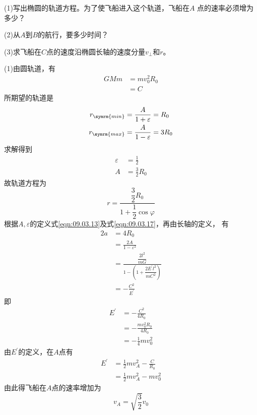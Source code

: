 (1)写出椭圆的轨道方程。为了使飞船进入这个轨道，飞船在$ A $
点的速率必须增为多少？

(2)从$ A $到$ B $的航行，要多少时间？


(3)求飞船在$ C $点的速度沿椭圆长轴的速度分量$ v _ \bot $和$ \dot{ r } $。

\solution (1)由圆轨道，有
\begin{equation*}
  \begin{split}
    G M m &= m v _ 0 ^ { 2 } R _ { 0 } \\
    &= C
  \end{split}
\end{equation*}
所期望的轨道是
\begin{align*}
  r _ { \symrm{ min } } & = \frac { A } { 1 + \varepsilon } = R _ { 0 }   \\
  r _ { \symrm{ max } } & = \frac { A } { 1 - \varepsilon } = 3 R _ { 0 }
\end{align*}
求解得到
\begin{align*}
  \varepsilon & = \frac { 1 } { 2 }           \\
  A           & = \frac { 3 } { 2 } R _ { 0 }
\end{align*}
故轨道方程为
\begin{equation*}
  r = \frac { \dfrac { 3 } { 2 } R _ { 0 } } { 1 + \dfrac { 1 } { 2 } \cos \varphi }
\end{equation*}
根据$ A , \varepsilon $的定义\lhbrak 式\eqref{eqn:09.03.13}及式\eqref{eqn:09.03.17}\rhbrak ，再由长轴的定义，
有
\begin{equation*}
  \begin{split}
    2 a &= 4 R _ { 0 } \\
    &= \frac { 2 A } { 1 - \varepsilon ^ { 2 } } \\
    &= \frac { \dfrac { 2 l ^ { 2 } } { m G } } { 1 - \left( 1 + \dfrac { 2 E ^ { \prime } l ^ { 2 } } { m C ^ { 2 } } \right) }\\
    &= - \frac { C ^ { 2 } } { E ^ { \prime } }
  \end{split}
\end{equation*}
即
\begin{equation*}
  \begin{split}
    E ^ { \prime } &= - \frac { C ^ { 2 } } { 4 R _ { 0 } } \\
    &= - \frac { m v _ 0 ^ { 2 } R _ { 0 } } { 4 R _ { 0 } } \\
    &= - \frac { 1 } { 4 } m v _ { 0 } ^ 2
  \end{split}
\end{equation*}
由$ E ^ { \prime } $的定义，在$ A $点有
\begin{equation*}
  \begin{split}
    E ^ { \prime } &= \frac { 1 } { 2 } m v _ A ^ { 2 } - \frac { C } { R _ { 0 } } \\
    &= \frac { 1 } { 2 } m v _ A ^ { 2 } - m v _ 0 ^ { 2 }
  \end{split}
\end{equation*}
由此得飞船在$ A $点的速率增加为
\begin{equation*}
  v _ { A } = \sqrt { \frac { 3 } { 2 } } v _ { 0 }
\end{equation*}


